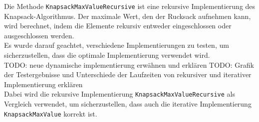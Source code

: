 Die Methode \texttt{KnapsackMaxValueRecursive} ist eine rekursive Implementierung des Knapsack-Algorithmus. Der maximale
Wert, den der Rucksack aufnehmen kann, wird berechnet, indem die Elemente rekursiv entweder eingeschlossen oder ausgeschlossen
werden.\\
Es wurde darauf geachtet, verschiedene Implementierungen zu testen, um sicherzustellen, dass die optimale
Implementierung verwendet wird.
\\
TODO: neue dynamische implementierung erwähnen und erklären
TODO: Grafik der Testergebnisse und Unterschiede der Laufzeiten von rekursiver und iterativer Implementierung erklären
\\
Dabei wird die rekursive Implementierung \texttt{KnapsackMaxValueRecursive} als Vergleich verwendet, um sicherzustellen, dass
auch die iterative Implementierung \texttt{KnapsackMaxValue} korrekt ist.